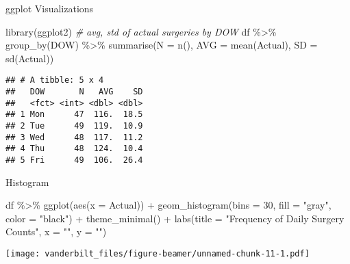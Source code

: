 \documentclass[
  ignorenonframetext,
]{beamer}
\newenvironment{Shaded}{\begin{snugshade}}{\end{snugshade}}
\newcommand{\AttributeTok}[1]{\textcolor[rgb]{0.77,0.63,0.00}{#1}}
\newcommand{\CommentTok}[1]{\textcolor[rgb]{0.56,0.35,0.01}{\textit{#1}}}
\newcommand{\DecValTok}[1]{\textcolor[rgb]{0.00,0.00,0.81}{#1}}
\newcommand{\FunctionTok}[1]{\textcolor[rgb]{0.00,0.00,0.00}{#1}}
\newcommand{\NormalTok}[1]{#1}
\newcommand{\SpecialCharTok}[1]{\textcolor[rgb]{0.00,0.00,0.00}{#1}}
\newcommand{\StringTok}[1]{\textcolor[rgb]{0.31,0.60,0.02}{#1}}
\begin{document}
\begin{frame}[fragile]{ggplot Visualizations}
\protect\hypertarget{ggplot-visualizations}{}
\begin{Shaded}
\begin{Highlighting}[]
\FunctionTok{library}\NormalTok{(ggplot2)}
\CommentTok{\# avg, std of actual surgeries by DOW}
\NormalTok{df }\SpecialCharTok{\%\textgreater{}\%} 
  \FunctionTok{group\_by}\NormalTok{(DOW) }\SpecialCharTok{\%\textgreater{}\%} 
  \FunctionTok{summarise}\NormalTok{(}\AttributeTok{N =} \FunctionTok{n}\NormalTok{(),}
            \AttributeTok{AVG =} \FunctionTok{mean}\NormalTok{(Actual),}
            \AttributeTok{SD =} \FunctionTok{sd}\NormalTok{(Actual))}
\end{Highlighting}
\end{Shaded}

\begin{verbatim}
## # A tibble: 5 x 4
##   DOW       N   AVG    SD
##   <fct> <int> <dbl> <dbl>
## 1 Mon      47  116.  18.5
## 2 Tue      49  119.  10.9
## 3 Wed      48  117.  11.2
## 4 Thu      48  124.  10.4
## 5 Fri      49  106.  26.4
\end{verbatim}

\begin{block}{Histogram}
\protect\hypertarget{histogram}{}
\begin{Shaded}
\begin{Highlighting}[]
\NormalTok{df }\SpecialCharTok{\%\textgreater{}\%} 
  \FunctionTok{ggplot}\NormalTok{(}\FunctionTok{aes}\NormalTok{(}\AttributeTok{x =}\NormalTok{ Actual)) }\SpecialCharTok{+} 
  \FunctionTok{geom\_histogram}\NormalTok{(}\AttributeTok{bins =} \DecValTok{30}\NormalTok{, }\AttributeTok{fill =} \StringTok{"gray"}\NormalTok{, }\AttributeTok{color =} \StringTok{"black"}\NormalTok{) }\SpecialCharTok{+}
  \FunctionTok{theme\_minimal}\NormalTok{() }\SpecialCharTok{+}
  \FunctionTok{labs}\NormalTok{(}\AttributeTok{title =} \StringTok{"Frequency of Daily Surgery Counts"}\NormalTok{,}
       \AttributeTok{x =} \StringTok{""}\NormalTok{,}
       \AttributeTok{y =} \StringTok{""}\NormalTok{)}
\end{Highlighting}
\end{Shaded}

\texttt{[image: vanderbilt\_files/figure-beamer/unnamed-chunk-11-1.pdf]}
\end{block}


\end{frame}
\end{document}
